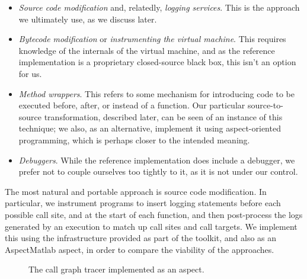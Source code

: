 \begin{itemize}
\item \emph{Source code modification} and, relatedly, \emph{logging services}.
This is the approach we ultimately use, as we discuss later.
\item \emph{Bytecode modification} or \emph{instrumenting the virtual machine}.
This requires knowledge of the internals of the \matlab virtual machine, and as
the reference \matlab implementation is a proprietary closed-source black box,
this isn't an option for us.
\item \emph{Method wrappers}. This refers to some mechanism for introducing
code to be executed before, after, or instead of a function. Our particular
source-to-source transformation, described later, can be seen of an instance of
this technique; we also, as an alternative, implement it using aspect-oriented
programming, which is perhaps closer to the intended meaning.
\item \emph{Debuggers}. While the reference \matlab implementation does include
a debugger, we prefer not to couple ourselves too tightly to it, as it is not
under our control.
\end{itemize}

The most natural and portable approach is source code modification. In
particular, we instrument programs to insert logging statements before each
possible call site, and at the start of each function, and then post-process
the logs generated by an execution to match up call sites and call targets.
We implement this using the infrastructure provided as part of the \mclab
toolkit, and also as an AspectMatlab aspect, in order to compare the viability
of the approaches.

\begin{figure}

\caption{The call graph tracer implemented as an aspect.}
\label{Fig:CallgraphAspect}
\end{figure}
